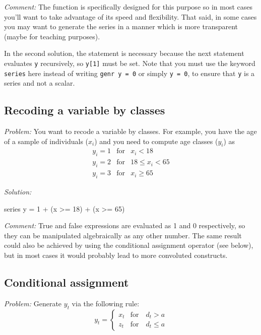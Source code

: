 \emph{Comment:} The  function is specifically designed for
this purpose so in most cases you'll want to take advantage of its
speed and flexibility. That said, in some cases you may want to
generate the series in a manner which is more transparent (maybe for
teaching purposes).

In the second solution, the statement  is necessary
because the next statement evaluates \texttt{y} recursively, so
\texttt{y[1]} must be set.  Note that you must use the keyword
\texttt{series} here instead of writing \texttt{genr y = 0} or simply
\texttt{y = 0}, to ensure that \texttt{y} is a series and
not a scalar.

\subsection{Recoding a variable by classes}

\emph{Problem:} You want to recode a variable by classes. For example,
you have the age of a sample of individuals ($x_i$) and you need to
compute age classes ($y_i$) as
\begin{eqnarray*}
  y_i = 1 & \mathrm{for} & x_i < 18 \\
  y_i = 2 & \mathrm{for} & 18 \le x_i < 65 \\
  y_i = 3 & \mathrm{for} & x_i \ge 65
\end{eqnarray*}

\emph{Solution:}
\begin{code}
series y = 1 + (x >= 18) + (x >= 65)
\end{code}

\emph{Comment:} True and false expressions are evaluated as 1 and 0
respectively, so they can be manipulated algebraically as any other
number. The same result could also be achieved by using the
conditional assignment operator (see below), but in most cases it
would probably lead to more convoluted constructs.

\subsection{Conditional assignment}

\emph{Problem:} Generate $y_t$ via the following rule:
\[
  y_t = \left\{
    \begin{array}{ll}
      x_t & \mathrm{for} \quad d_t > a \\
      z_t & \mathrm{for} \quad d_t \le a
    \end{array}
    \right.
\]

